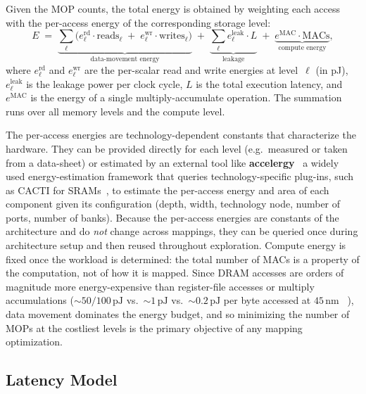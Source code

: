 Given the MOP counts, the total energy is obtained by weighting each
access with the per-access energy of the corresponding storage level:
\begin{equation}
\label{eq:energy}
E \;=\;
  \underbrace{\sum_{\ell}\bigl(
    e_{\ell}^{\text{rd}}\cdot\text{reads}_\ell \;+\;
    e_{\ell}^{\text{wr}}\cdot\text{writes}_\ell
  \bigr)}_{\text{data-movement energy}}
  \;+\;
  \underbrace{\sum_{\ell} e_{\ell}^{\text{leak}}\cdot L}_{\text{leakage}}
  \;+\;
  \underbrace{e^{\text{MAC}}\cdot\text{MACs}}_{\text{compute energy}},
\end{equation}
where $e_{\ell}^{\text{rd}}$ and $e_{\ell}^{\text{wr}}$ are the per-scalar
read and write energies at level~$\ell$ (in pJ), $e_{\ell}^{\text{leak}}$
is the leakage power per clock cycle, $L$ is the total execution latency,
and $e^{\text{MAC}}$ is the energy of a single multiply-accumulate operation.
The summation runs over all memory levels and the compute level.

The per-access energies are technology-dependent constants that characterize
the hardware.
They can be provided directly for each level (e.g.\ measured or taken from a
data-sheet) or estimated by an external tool like \textbf{accelergy}~\cite{wu2019accelergy} a widely used energy-estimation
framework that queries technology-specific plug-ins, such as CACTI for
SRAMs~\cite{cacti}, to estimate the per-access energy and area of
each component given its configuration (depth, width, technology node, number
of ports, number of banks).
Because the per-access energies are constants of the architecture and do
\emph{not} change across mappings, they can be queried once during
architecture setup and then reused throughout exploration.
Compute energy is fixed once the workload is determined: the
total number of MACs is a property of the computation, not of how it is
mapped.
Since DRAM accesses are orders of magnitude more energy-expensive than
register-file accesses or multiply accumulations (${\sim}50/100\,\text{pJ}$ vs.\
${\sim}1\,\text{pJ}$ vs.\ ${\sim}0.2\,\text{pJ}$ per byte accessed at $45\,$nm%
~\cite{horowitz20141}), data movement dominates the energy budget, and so
minimizing the number of MOPs at the costliest levels is the primary
objective of any mapping optimization.

\subsection{Latency Model}
\label{sec:latency-model}

